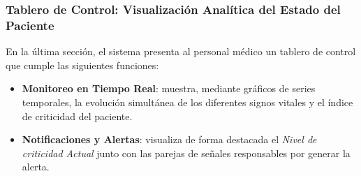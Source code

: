 \bigskip

\subsubsection*{Tablero de Control: Visualización Analítica del Estado del Paciente}

En la última sección, el sistema presenta al personal médico un tablero de control que cumple las siguientes funciones:

\begin{itemize}
  \item \textbf{Monitoreo en Tiempo Real}: muestra, mediante gráficos de series temporales, la evolución simultánea de los diferentes signos vitales y el índice de criticidad del paciente.
  \item \textbf{Notificaciones y Alertas}: visualiza de forma destacada el \emph{Nivel de criticidad Actual} junto con las parejas de señales responsables por generar la alerta.
\end{itemize}
